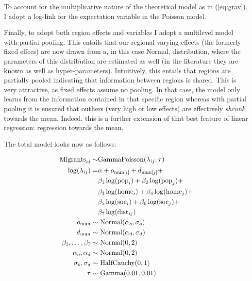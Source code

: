 \documentclass[fleqn,10pt]{SelfArx} %
\begin{document}
        To account for the multiplicative nature of the theoretical
        model as in (\ref{eq:grav}), I adopt a log-link for the
        expectation variable in the Poisson model.

        Finally, to adopt both region effects and variables I adopt a
        multilevel model with partial pooling. This entails that our
        regional varying effects (the formerly fixed effecs) are now
        drawn from a, in this case Normal, distribution, where the
        parameters of this distribution are estimated as well (in the
        literature they are known as well as
        hyper-parameters). Intuitively, this entails that regions are
        partially pooled indicating that information between regions
        is shared. This is very attractive, as fixed effects assume no
        pooling. In that case, the model only learns from the information contained
        in that specific region whereas with partial pooling it is ensured that
        outliers (very high or low effects) are effectively
        \emph{shrunk} towards the mean. Indeed, this is a further
        extension of that best feature of linear regression:
        regression towards the mean.

        The total model looks now as follows:
        
        \begin{subequations}
          \begin{align} \text{Migrants}_{ij} \sim & \text{GammaPoisson}(\lambda_{ij}, \tau) \label{outcome}\\
            \log(\lambda_{ij}) =
            & \alpha + o_{\text{mun}[i]} + d_{\text{mun}[j]} + \notag
            \\ & \beta_1 \log(\text{pop}_i) +
            \beta_2\log(\text{pop}_j) + \notag \\ & \beta_3
            \log(\text{home}_i) + \beta_4 \log(\text{home}_j) + \notag\\
            & \beta_5 \log(\text{soc}_i) + \beta_6 \log(\text{soc}_j)
            + \notag \\ & \beta_7 \log(\text{dist}_{ij}) \label{linear} \\
            o_{\text{mun}} \sim& \text{ Normal}(\alpha_o, \sigma_o) \label{muno} \\
            d_{\text{mun}} \sim& \text{ Normal}(\alpha_d, \sigma_d) \label{mund} \\
            \beta_1,\ldots, \beta_7 \sim& \text{
                                          Normal}(0,2)\\ \alpha_o, \alpha_d \sim& \text{ Normal}(0,2)\\
            \sigma_o, \sigma_d \sim& \text{ HalfCauchy}(0,1) \\ \tau
            \sim& \text{ Gamma}(0.01, 0.01)
          \end{align}
          \label{model}
        \end{subequations}
\end{document}
